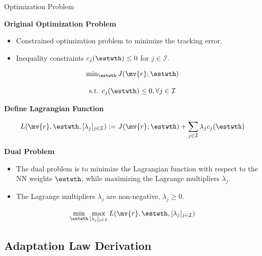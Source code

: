 \documentclass[8pt, aspectratio=169]{beamer}
\begin{document}
\begin{frame}{\insertsubsectionhead}{Optimization Problem}

  \textbf{Original Optimization Problem}

  \begin{itemize}
    \item Constrained optimization problem to minimize the tracking error.
    \item Inequality constraints $c_j(\estwth) \le 0$ for $j\in\mathcal{I}$.
  \end{itemize}

    \begin{equation}\label{eq:opt_problem}
      \begin{matrix}
        \min_{\estwth} J(\mv{r};\estwth)
        \\\ \\
        \text{s.t. } c_{j}(\estwth) 
        \le 
        0
        ,
        \forall j\in\mathcal{I}
      \end{matrix}
    \end{equation}

  \textbf{Define Lagrangian Function}

  \begin{equation}\label{eq:lagrangian}
      L(\mv{r},\estwth,[\lambda_j]_{j\in\mathcal{I}})
      :=
      J(\mv{r};\estwth)
      +
      \sum_{j\in\mathcal{I}} \lambda_j c_j(\estwth)
  \end{equation}

  \textbf{Dual Problem}
  \begin{itemize}
    \item The dual problem is to minimize the Lagrangian function with respect to the NN weights $\estwth$, while maximizing the Lagrange multipliers $\lambda_j$.
    \item The Lagrange multipliers $\lambda_j$ are non-negative, \ie $\lambda_j \ge 0$.
  \end{itemize}

  \begin{equation}\label{eq:dual_problem}
    \min_{\estwth}\max_{[\lambda_j]_{j\in\mathcal{I}}} 
    L(\mv{r},\estwth,[\lambda_j]_{j\in\mathcal{I}})
  \end{equation}

\end{frame}

\subsection{Adaptation Law Derivation}
\end{document}

